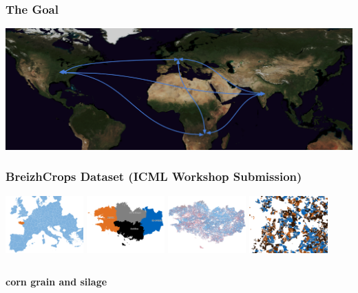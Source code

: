 \begin{frame}
	\frametitle{The Goal}
	\includegraphics[width=\textwidth]{images/generalization}
\end{frame}

\begin{frame}
\frametitle{BreizhCrops Dataset (ICML Workshop Submission)}

\begin{center}
	\includegraphics[width=3cm]{images/map/europe}
	\includegraphics[width=3cm]{images/map/regions}
	\includegraphics[width=3cm]{images/map/breizh}
	\includegraphics[width=3cm]{images/map/parcels}
\end{center}



\begin{columns}
	
	\textbf{corn grain and silage}
	

\end{columns}
\end{frame}
